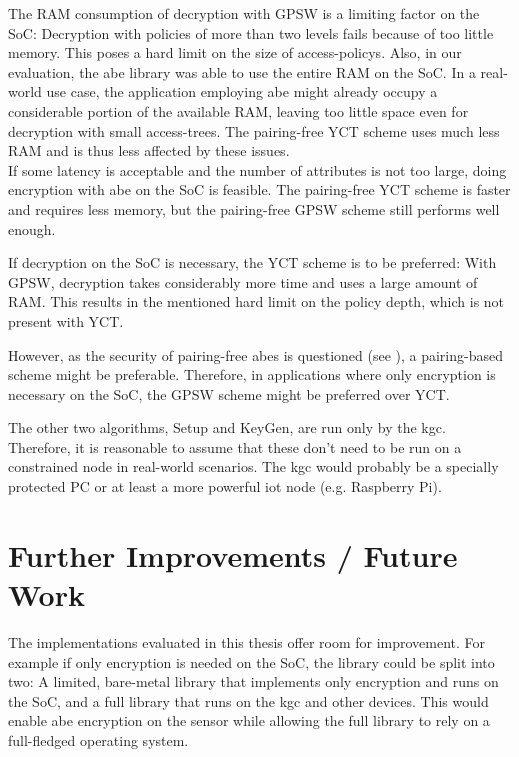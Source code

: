 The RAM consumption of decryption with GPSW is a limiting factor on the SoC:
Decryption with policies of more than two levels fails because of too little memory.
This poses a hard limit on the size of \glspl{access-policy}.
Also, in our evaluation, the \acrshort{abe} library was able to use  the entire RAM on the SoC.
In a real-world use case, the application employing \acrshort{abe} might already occupy a considerable portion of the available RAM, leaving too little space even for decryption with small \glspl{access-tree}.
The pairing-free YCT scheme uses much less RAM and is thus less affected by these issues.\\

If some latency is acceptable and the number of attributes is not too large, doing encryption with \acrshort{abe} on the SoC is feasible.
The pairing-free YCT scheme is faster and requires less memory, but the pairing-free GPSW scheme still performs well enough.

If decryption on the SoC is necessary, the YCT scheme is to be preferred:
With GPSW, decryption takes considerably more time and uses a large amount of RAM.
This results in the mentioned hard limit on the policy depth, which is not present with YCT.

However, as the security of pairing-free \acrshort{abes} is questioned (see \cite{herranz_attacking_2020}), a pairing-based scheme might be preferable.
Therefore, in applications where only encryption is necessary on the SoC, the GPSW scheme might be preferred over YCT.

The other two algorithms, Setup and KeyGen, are run only by the \acrshort{kgc}.
Therefore, it is reasonable to assume that these don't need to be run on a constrained node in real-world scenarios.
The \acrshort{kgc} would probably be a specially protected PC or at least a more powerful \acrshort{iot} node (e.g. Raspberry Pi).

\section{Further Improvements / Future Work}

The implementations evaluated in this thesis offer room for improvement.
For example if only encryption is needed on the SoC, the library could be split into two:
A limited, bare-metal library that implements only encryption and runs on the SoC, and a full library that runs on the \acrshort{kgc} and other devices.
This would enable \acrshort{abe} encryption on the sensor while allowing the full library to rely on a full-fledged operating system.


